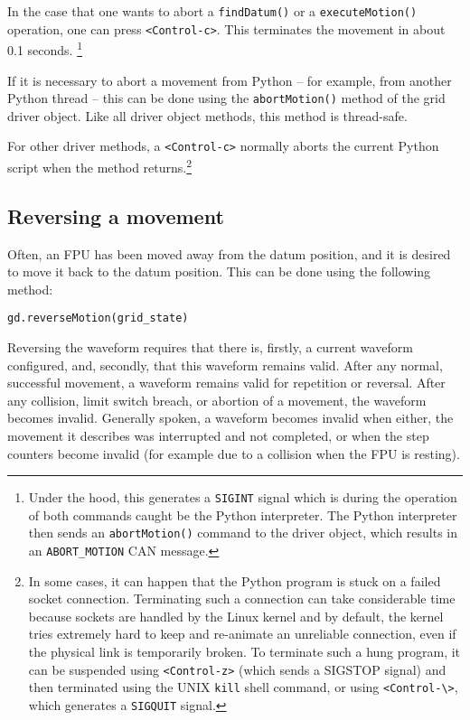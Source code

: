\documentclass{scrartcl}[12pt,a4paper]
\begin{document}
In the case that one wants to abort a \texttt{findDatum()} or a
\texttt{executeMotion()} operation, one can press
\verb+<Control-c>+. This terminates the movement in about 0.1
seconds. \footnote{Under the hood, this generates a \texttt{SIGINT}
  signal which is during the operation of both commands caught be the
  Python interpreter. The Python interpreter then sends an
  \texttt{abortMotion()} command to the driver object, which results
  in an \texttt{ABORT\_MOTION} CAN message.}

If it is necessary to abort a movement from Python -- for example,
from another Python thread -- this can be done using the
\texttt{abortMotion()} method of the grid driver object.  Like all
driver object methods, this method is thread-safe.

For other driver methods, a \verb+<Control-c>+ normally aborts the
current Python script when the method returns.\footnote{In some cases,
  it can happen that the Python program is stuck on a failed socket
  connection. Terminating such a connection can take considerable time
  because sockets are handled by the Linux kernel and by default, the
  kernel tries extremely hard to keep and re-animate an unreliable
  connection, even if the physical link is temporarily broken. To
  terminate such a hung program, it can be suspended using
  \texttt{<Control-z>} (which sends a SIGSTOP signal) and then
  terminated using the UNIX \texttt{kill} shell command, or using
  \texttt{<Control-\textbackslash>}, which generates a
  \texttt{SIGQUIT} signal.}


\subsection{Reversing a movement}
Often, an FPU has been moved away from the datum position, and it is
desired to move it back to the datum position.  This can be done using
the following method:

\begin{verbatim}
gd.reverseMotion(grid_state)
\end{verbatim}

Reversing the waveform requires that there is, firstly, a current
waveform configured, and, secondly, that this waveform remains valid.
After any normal, successful movement, a waveform remains valid for
repetition or reversal. After any collision, limit switch breach, or
abortion of a movement, the waveform becomes invalid. Generally
spoken, a waveform becomes invalid when either, the movement it
describes was interrupted and not completed, or when the step counters
become invalid (for example due to a collision when the FPU is
resting).
\end{document}
